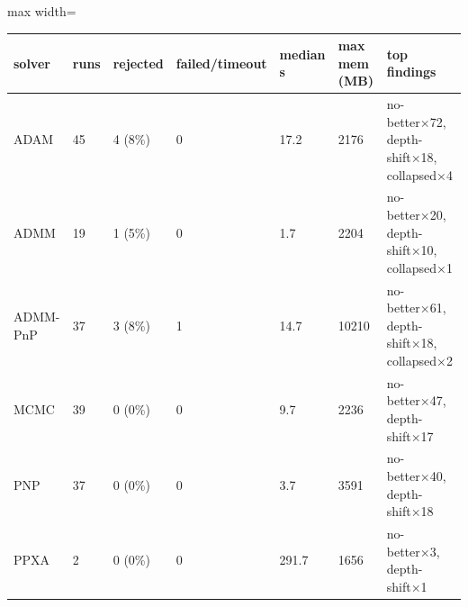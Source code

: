\begin{center}\begin{minipage}{\linewidth}\centering
{}
\begin{adjustbox}{max width=\linewidth}
\begin{tabular}{lllllll}
\toprule
solver & runs & rejected & failed/timeout & median s & max mem (MB) & top findings \\
\midrule
ADAM & 45 & 4 (8\%) & 0 & 17.2 & 2176 & no-better×72, depth-shift×18, collapsed×4 \\
ADMM & 19 & 1 (5\%) & 0 & 1.7 & 2204 & no-better×20, depth-shift×10, collapsed×1 \\
ADMM-PnP & 37 & 3 (8\%) & 1 & 14.7 & 10210 & no-better×61, depth-shift×18, collapsed×2 \\
MCMC & 39 & 0 (0\%) & 0 & 9.7 & 2236 & no-better×47, depth-shift×17 \\
PNP & 37 & 0 (0\%) & 0 & 3.7 & 3591 & no-better×40, depth-shift×18 \\
PPXA & 2 & 0 (0\%) & 0 & 291.7 & 1656 & no-better×3, depth-shift×1 \\
\bottomrule
\end{tabular}\end{adjustbox}\end{minipage}\end{center}

